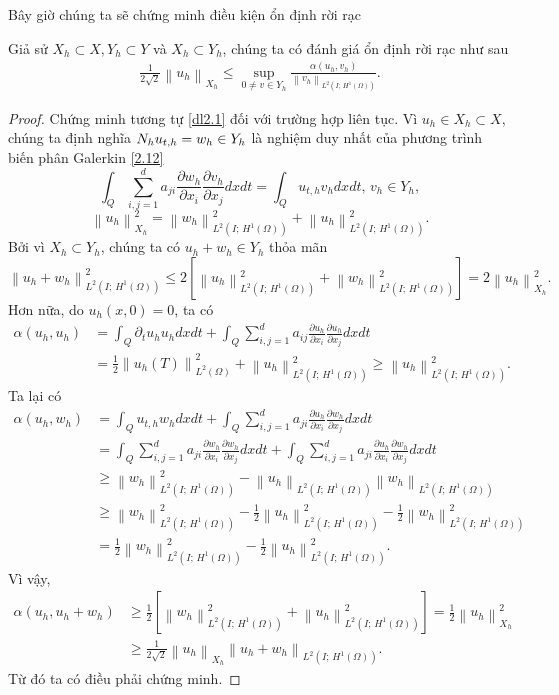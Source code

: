 \documentclass[]{article}
\begin{document}
Bây giờ chúng ta sẽ chứng minh điều kiện ổn định rời rạc
\begin{dl}\label{dl2.2}
	Giả sử $X_h\subset X, Y_h\subset Y$ và $X_h\subset Y_h$, chúng ta có đánh giá ổn định rời rạc như sau
	\begin{align}\label{2.15}
	\frac{1}{2\sqrt{2}}\left\|u_h\right\|_{X_h}\leq \sup_{0\neq v\in Y_h}\frac{\alpha(u_h, v_h)}{\left\|v_h\right\|_{L^2(I;\, H^1(\Omega))}}.
	\end{align}
\end{dl}
\begin{proof}
	Chứng minh tương tự \cref{dl2.1} đối với trường hợp liên tục. Vì $u_h\in X_h\subset X$, chúng ta định nghĩa $\mathnormal{N}_hu_{t, h}=w_h\in Y_h$ là nghiệm duy nhất của phương trình biến phân Galerkin \eqref{2.12}
	$$\int_{Q}\sum_{i, j=1}^{d}a_{ji}\frac{\partial w_h}{\partial x_i}\frac{\partial v_h}{\partial x_j}dxdt=\int_{Q}u_{t, h}v_hdxdt,\, v_h\in Y_h,$$
	$$\left\|u_h\right\|_{X_h}^2= \left\|w_h\right\|_{L^2(I;\, H^1(\Omega))}^2+\left\|u_h\right\|_{L^2(I;\, H^1(\Omega))}^2.$$
	Bởi vì $X_h\subset Y_h$, chúng ta có $u_h+w_h\in Y_h$ thỏa mãn
	$$\left\|u_h+w_h\right\|_{L^2(I;\, H^1(\Omega))}^2\leq2\left[\left\|u_h\right\|_{L^2(I;\, H^1(\Omega))}^2+\left\|w_h\right\|_{L^2(I;\, H^1(\Omega))}^2\right]=2\left\|u_h\right\|_{X_h}^2.$$
	Hơn nữa, do $u_h(x, 0)=0$, ta có
	\begin{align*}
	\alpha(u_h, u_h)&=\int_{Q}\partial_tu_hu_hdxdt+\int_{Q}\sum_{i, j=1}^{d}a_{ij}\frac{\partial u_h}{\partial x_i}\frac{\partial u_h}{\partial x_j}dxdt\\
	&=\frac{1}{2}\left\|u_h(T)\right\|_{L^2(\Omega)}^2+\left\|u_h\right\|_{L^2(I;\, H^1(\Omega))}^2\geq \left\|u_h\right\|_{L^2(I;\, H^1(\Omega))}^2.
	\end{align*}
	Ta lại có
	\begin{align*}
	\alpha(u_h, w_h)&=\int_{Q}u_{t, h}w_hdxdt+\int_{Q}\sum_{i, j=1}^{d}a_{ji}\frac{\partial u_h}{\partial x_i}\frac{\partial w_h}{\partial x_j}dxdt\\
	&=\int_{Q}\sum_{i, j=1}^{d}a_{ji}\frac{\partial w_h}{\partial x_i}\frac{\partial w_h}{\partial x_j}dxdt+\int_{Q}\sum_{i, j=1}^{d}a_{ji}\frac{\partial u_h}{\partial x_i}\frac{\partial w_h}{\partial x_j}dxdt\\
	&\geq\left\|w_h\right\|_{L^2(I;\, H^1(\Omega))}^2-\left\|u_h\right\|_{L^2(I;\, H^1(\Omega))}\left\|w_h\right\|_{L^2(I;\, H^1(\Omega))}\\
	&\geq \left\|w_h\right\|_{L^2(I;\, H^1(\Omega))}^2-\frac{1}{2}\left\|u_h\right\|_{L^2(I;\, H^1(\Omega))}^2-\frac{1}{2}\left\|w_h\right\|_{L^2(I;\, H^1(\Omega))}^2\\
	&=\frac{1}{2}\left\|w_h\right\|_{L^2(I;\, H^1(\Omega))}^2-\frac{1}{2}\left\|u_h\right\|_{L^2(I;\, H^1(\Omega))}^2.
	\end{align*}
	Vì vậy,
	\begin{align*}
	\alpha(u_h, u_h+w_h)&\geq \frac{1}{2}\left[\left\|w_h\right\|_{L^2(I;\, H^1(\Omega))}^2+\left\|u_h\right\|_{L^2(I;\, H^1(\Omega))}^2\right]=\frac{1}{2}\left\|u_h\right\|^2_{X_h}\\
	&\geq \frac{1}{2\sqrt{2}}\left\|u_h\right\|_{X_h}\left\|u_h+w_h\right\|_{L^2(I;\,H^1(\Omega))}.
	\end{align*}
	Từ đó ta có điều phải chứng minh.
\end{proof}
\end{document}
